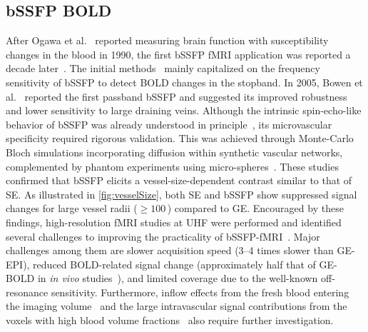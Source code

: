 \subsection{bSSFP BOLD}
\label{subsec:bssfp_bold}
After Ogawa et al.~\cite{ogawaBrainMagneticResonance1990} reported measuring brain function with susceptibility changes in the blood in 1990, the first \gls{bSSFP} \gls{fMRI} application was reported a decade later~\cite{schefflerDetectionBOLDChanges2001}. The initial methods~\cite{schefflerDetectionBOLDChanges2001,millerFunctionalBrainImaging2003} mainly capitalized on the frequency sensitivity of \gls{bSSFP} to detect \gls{BOLD} changes in the stopband. In 2005, Bowen et al.~\cite{bowenHighFieldBalancedSSFP2005,bowenHighFieldBalancedSSFP2006} reported the first passband \gls{bSSFP} and suggested its improved robustness and lower sensitivity to large draining veins. Although the intrinsic spin-echo-like behavior of \gls{bSSFP} was already understood in principle~\cite{schefflerTrueFISPGradientechoSpinecho2003}, its microvascular specificity required rigorous validation. This was achieved through Monte-Carlo Bloch simulations incorporating diffusion within synthetic vascular networks, complemented by phantom experiments using micro-spheres~\cite{baez-yanezImpactVesselSize2017,schefflerBOLDSensitivityRapid2019}. These studies confirmed that \gls{bSSFP} elicits a vessel-size-dependent contrast similar to that of \gls{SE}. As illustrated in \cref{fig:vesselSize}, both \gls{SE} and \gls{bSSFP} show suppressed signal changes for large vessel radii ($\ge 100\,$) compared to \gls{GE}. Encouraged by these findings, high-resolution \gls{fMRI} studies at \gls{UHF} were performed and identified several challenges to improving the practicality of \gls{bSSFP}-\gls{fMRI}~\cite{schefflerHighresolutionFunctionalImaging2015,schefflerHighresolutionMappingNeuronal2016}. Major challenges among them are slower acquisition speed (3--4 times slower than \gls{GE}-\gls{EPI}), reduced \gls{BOLD}-related signal change (approximately half that of \gls{GE}-\gls{BOLD} in \textit{in vivo} studies~\cite{schefflerHighresolutionMappingNeuronal2016}), and limited coverage due to the well-known off-resonance sensitivity. Furthermore, inflow effects from the fresh blood entering the imaging volume~\cite{gaoInflowEffectsFunctional2012,renvallAllThatGlitters2014} and the large intravascular signal contributions from the voxels with high blood volume fractions~\cite{baez-yanezImpactVesselSize2017} also require further investigation.

